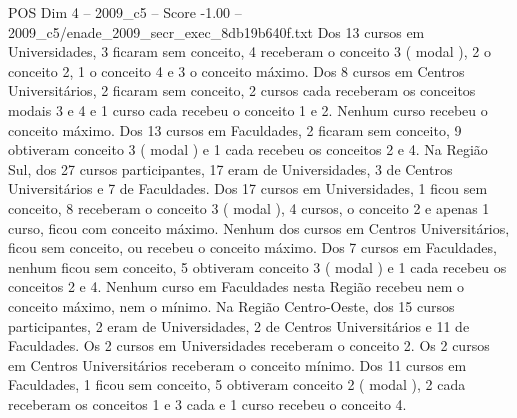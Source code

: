 \begin{textsample}{POS Dim 4 – 2009\_c5 – Score -1.00 – 2009\_c5/enade\_2009\_secr\_exec\_8db19b640f.txt}
Dos 13 cursos em Universidades, 3 ficaram sem conceito, 4 receberam o conceito 3 ( modal ), 2 o conceito 2, 1 o conceito 4 e 3 o conceito máximo.
Dos 8 cursos em Centros Universitários, 2 ficaram sem conceito, 2 cursos cada receberam os conceitos modais 3 e 4 e 1 curso cada recebeu o conceito 1 e 2.
Nenhum curso recebeu o conceito máximo.
Dos 13 cursos em Faculdades, 2 ficaram sem conceito, 9 obtiveram conceito 3 ( modal ) e 1 cada recebeu os conceitos 2 e 4.
Na Região Sul, dos 27 cursos participantes, 17 eram de Universidades, 3 de Centros Universitários e 7 de Faculdades.
Dos 17 cursos em Universidades, 1 ficou sem conceito, 8 receberam o conceito 3 ( modal ), 4 cursos, o conceito 2 e apenas 1 curso, ficou com conceito máximo.
Nenhum dos cursos em Centros Universitários, ficou sem conceito, ou recebeu o conceito máximo.
Dos 7 cursos em Faculdades, nenhum ficou sem conceito, 5 obtiveram conceito 3 ( modal ) e 1 cada recebeu os conceitos 2 e 4.
Nenhum curso em Faculdades nesta Região recebeu nem o conceito máximo, nem o mínimo.
Na Região Centro-Oeste, dos 15 cursos participantes, 2 eram de Universidades, 2 de Centros Universitários e 11 de Faculdades.
Os 2 cursos em Universidades receberam o conceito 2.
Os 2 cursos em Centros Universitários receberam o conceito mínimo.
Dos 11 cursos em Faculdades, 1 ficou sem conceito, 5 obtiveram conceito 2 ( modal ), 2 cada receberam os conceitos 1 e 3 cada e 1 curso recebeu o conceito 4.

\end{textsample}
